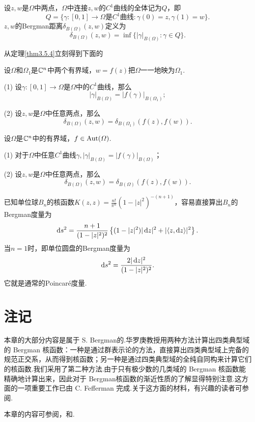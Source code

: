 \begin{definition}\label{def3.5.7}
	设$z,w$是$\Omega$中两点，$\Omega$中连接$z,w$的$C^1$曲线的全体记为$Q$，即
	\[Q=\{\gamma\colon[0,1]\to\Omega\text{是$C^1$曲线}\colon\gamma(0)=z,\gamma(1)=w\}.\]
	$z,w$的Bergman距离$\delta_{B(\Omega)}(z,w)$定义为
	\[\delta_{B(\Omega)}(z,w)=\inf\{|\gamma|_{B(\Omega)}\colon\gamma\in Q\}.\]
\end{definition}
从定理\ref{thm3.5.4}立刻得到下面的
\begin{theorem}\label{thm3.5.8}
	设$\Omega$和$\Omega_1$是$\mathbb C^n$中两个有界域，$w=f(z)$把$\Omega$一一地映为$\Omega_1$.
	
	(1)
	设$\gamma\colon[0,1]\to\Omega$是$\Omega$中的$C^1$曲线，那么
	\[|\gamma|_{B(\Omega)}=|f(\gamma)|_{B(\Omega_1)};\]
	
	(2)
	设$z,w$是$\Omega$中任意两点，那么
	\[\delta_{B(\Omega)}(z,w)=\delta_{B(\Omega_1)}(f(z),f(w)).\]
\end{theorem}
\begin{corollary}\label{cor3.5.9}
	设$\Omega$是$\mathbb C^n$中的有界域，$f\in\operatorname{Aut}(\varOmega)$.
	
	(1)
	对于$\Omega$中任意$C^1$曲线$\gamma,|\gamma|_{B(\Omega)}=|f(\gamma)|_{B(\Omega)}$；
	
	(2)
	设$z,w$是$\Omega$中任意两点，那么
	\[\delta_{B(\Omega)}(z,w)=\delta_{B(\Omega)}(f(z),f(w)).\]
\end{corollary}
已知单位球$B_n$的核函数$K(z,z)=\frac{n!}{\pi^n}(1-|z|^2)^{-(n+1)}$，容易直接算出$B_n$的Bergman度量为
\[\mathop{}\!\mathrm{d} s^2=\frac{n+1}{(1-|z|^2)^2}\left\{(1-|z|^2)|\mathop{}\!\mathrm{d} z|^2+|\langle z,\mathop{}\!\mathrm{d} z\rangle|^2\right\}.\]
当$n=1$时，即单位圆盘的Bergman度量为
\[\mathop{}\!\mathrm{d} s^2=\frac{2|\mathop{}\!\mathrm{d} z|^2}{(1-|z|^2)^2}.\]
它就是通常的Poincar\'e度量.
\section*{注记}
本章的大部分内容是属于 S. Bergman\cite{bergman1951kernel}的.华罗庚教授\cite{华罗庚1958多复变数函数论中的典型域的调和分析}用两种方法计算出四类典型域的 Bergman 核函数：一种是通过群表示论的方法，直接算出四类典型域上完备的规范正交系，从而得到核函数；另一种是通过四类典型域的全纯自同构来计算它们的核函数.我们采用了第二种方法.由于只有极少数的几类域的 Bergman 核函数能精确地计算出来，因此对于 Bergman核函数的渐近性质的了解显得特别注意.这方面的一项重要工作已由 C. Fefferman 完成.关于这方面的材料，有兴趣的读者可参阅\cite{fefferman1974bergman}.

本章的内容可参阅\cite{华罗庚1958多复变数函数论中的典型域的调和分析}，\cite{陆启铿1956多复变数函数与酉几何,陆启铿1961多复变数函数引论,陆启铿1963典型流形与典型域}和\cite{krantz2001function}.